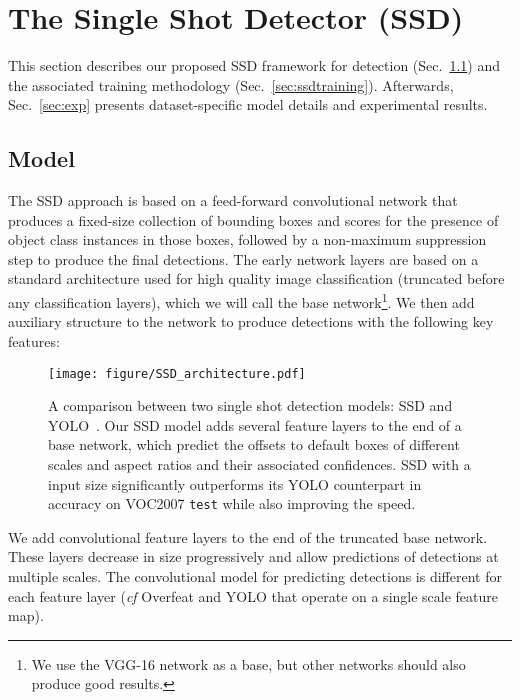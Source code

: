 \documentclass[runningheads]{llncs}
\begin{document}
\section{The Single Shot Detector (SSD)}
\label{sec:ssd}

This section describes our proposed SSD framework for detection (Sec.~\ref{sec:ssdmodel}) and the associated training methodology (Sec.~\ref{sec:ssdtraining}). Afterwards, Sec.~\ref{sec:exp} presents dataset-specific model details and experimental results.

\subsection{Model}
\label{sec:ssdmodel}

The SSD approach is based on a feed-forward convolutional network that produces a fixed-size collection of bounding boxes and scores for the presence of object class instances in those boxes, followed by a non-maximum suppression step to produce the final detections. The early network layers are based on a standard architecture used for high quality image classification (truncated before any classification layers), which we will call the base network\footnote{We use the VGG-16 network as a base, but other networks should also produce good results.}. We then add auxiliary structure to the network to produce detections with the following key features:

\begin{figure}
	\centering
	\texttt{[image: figure/SSD\_architecture.pdf]}
    \caption{A comparison between two single shot detection models: SSD and YOLO~\cite{redmon2015you}. Our SSD model adds several feature layers to the end of a base network, which predict the offsets to default boxes of different scales and aspect ratios and their associated confidences. SSD with a  input size significantly outperforms its  YOLO counterpart in accuracy on VOC2007 \texttt{test} while also improving the speed.}
    \label{fig:architecture}
\end{figure}

\smallskip
{} We add convolutional feature layers to the end of the truncated base network. These layers decrease in size progressively and allow predictions of detections at multiple scales.  The convolutional model for predicting detections is different for each feature layer ({\em cf} Overfeat\cite{sermanet2013overfeat} and YOLO\cite{redmon2015you} that operate on a single scale feature map).
\end{document}
